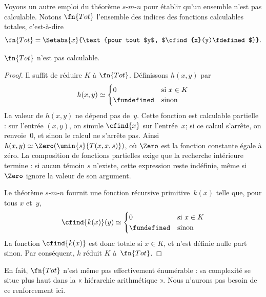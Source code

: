 \documentclass[../../../include/open-logic-section]{subfiles}
\begin{document}

Voyons un autre emploi du théorème $s$-$m$-$n$
pour établir qu'un ensemble n'est pas calculable.
Notons $\fn{Tot}$ l'ensemble des indices des
fonctions calculables totales, c'est-à-dire
\[
\fn{Tot} = \Setabs{x}{\text{pour tout $y$, $\cfind{x}(y)\fdefined$}}.
\]

\begin{prop}
$\fn{Tot}$ n'est pas calculable.
\end{prop}

\begin{proof}
Il suffit de réduire $K$ à $\fn{Tot}$.
Définissons $h(x,y)$ par
\[
h(x,y) \simeq
\begin{cases}
0 & \text{si $x \in K$} \\
\fundefined & \text{sinon}
\end{cases}
\]
La valeur de $h(x,y)$ ne dépend pas de~$y$.
Cette fonction est calculable partielle : sur
l'entrée $(x,y)$, on simule $\cfind{x}$ sur
l'entrée~$x$; si ce calcul s'arrête, on renvoie~$0$,
et sinon le calcul ne s'arrête pas. Ainsi
$h(x,y)\simeq\Zero(\umin{s}{T(x,x,s)})$,
où $\Zero$ est la fonction constante égale à zéro. La composition de fonctions partielles exige que la recherche intérieure termine : si aucun témoin $s$ n'existe, cette expression reste indéfinie, même si $\Zero$ ignore la valeur de son argument.

Le théorème $s$-$m$-$n$ fournit une fonction
récursive primitive~$k(x)$ telle que, pour tous
$x$ et~$y$,
\[
\cfind{k(x)}(y) \simeq
\begin{cases}
0 & \text{si $x \in K$} \\
\fundefined & \text{sinon}
\end{cases}
\]
La fonction $\cfind{k(x)}$ est donc totale si
$x\in K$, et n'est définie nulle part sinon.
Par conséquent, $k$ réduit $K$ à~$\fn{Tot}$.
\end{proof}

\begin{digress}
En fait, $\fn{Tot}$ n'est même pas effectivement
énumérable : sa complexité se situe plus haut
dans la « hiérarchie arithmétique ». Nous
n'aurons pas besoin de ce renforcement ici.
\end{digress}
\end{document}
